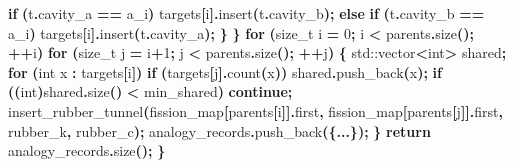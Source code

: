 \documentclass[
  11pt,
  a4paper,
]{article}
\newenvironment{Shaded}{\begin{snugshade}}{\end{snugshade}}
\newcommand{\BuiltInTok}[1]{#1}
\newcommand{\ControlFlowTok}[1]{\textcolor[rgb]{0.13,0.29,0.53}{\textbf{#1}}}
\newcommand{\DataTypeTok}[1]{\textcolor[rgb]{0.13,0.29,0.53}{#1}}
\newcommand{\DecValTok}[1]{\textcolor[rgb]{0.00,0.00,0.81}{#1}}
\newcommand{\NormalTok}[1]{#1}
\newcommand{\OperatorTok}[1]{\textcolor[rgb]{0.81,0.36,0.00}{\textbf{#1}}}
\begin{document}
\begin{Shaded}
\begin{Highlighting}[]
            \ControlFlowTok{if} \OperatorTok{(}\NormalTok{t}\OperatorTok{.}\NormalTok{cavity\_a }\OperatorTok{==}\NormalTok{ a\_i}\OperatorTok{)}\NormalTok{      targets}\OperatorTok{[}\NormalTok{i}\OperatorTok{].}\NormalTok{insert}\OperatorTok{(}\NormalTok{t}\OperatorTok{.}\NormalTok{cavity\_b}\OperatorTok{);}
            \ControlFlowTok{else} \ControlFlowTok{if} \OperatorTok{(}\NormalTok{t}\OperatorTok{.}\NormalTok{cavity\_b }\OperatorTok{==}\NormalTok{ a\_i}\OperatorTok{)}\NormalTok{ targets}\OperatorTok{[}\NormalTok{i}\OperatorTok{].}\NormalTok{insert}\OperatorTok{(}\NormalTok{t}\OperatorTok{.}\NormalTok{cavity\_a}\OperatorTok{);}
        \OperatorTok{\}}
    \OperatorTok{\}}
    \ControlFlowTok{for} \OperatorTok{(}\DataTypeTok{size\_t}\NormalTok{ i }\OperatorTok{=} \DecValTok{0}\OperatorTok{;}\NormalTok{ i }\OperatorTok{\textless{}}\NormalTok{ parents}\OperatorTok{.}\NormalTok{size}\OperatorTok{();} \OperatorTok{++}\NormalTok{i}\OperatorTok{)}
      \ControlFlowTok{for} \OperatorTok{(}\DataTypeTok{size\_t}\NormalTok{ j }\OperatorTok{=}\NormalTok{ i}\OperatorTok{+}\DecValTok{1}\OperatorTok{;}\NormalTok{ j }\OperatorTok{\textless{}}\NormalTok{ parents}\OperatorTok{.}\NormalTok{size}\OperatorTok{();} \OperatorTok{++}\NormalTok{j}\OperatorTok{)} \OperatorTok{\{}
        \BuiltInTok{std::}\NormalTok{vector}\OperatorTok{\textless{}}\DataTypeTok{int}\OperatorTok{\textgreater{}}\NormalTok{ shared}\OperatorTok{;}
        \ControlFlowTok{for} \OperatorTok{(}\DataTypeTok{int}\NormalTok{ x }\OperatorTok{:}\NormalTok{ targets}\OperatorTok{[}\NormalTok{i}\OperatorTok{])} \ControlFlowTok{if} \OperatorTok{(}\NormalTok{targets}\OperatorTok{[}\NormalTok{j}\OperatorTok{].}\NormalTok{count}\OperatorTok{(}\NormalTok{x}\OperatorTok{))}\NormalTok{ shared}\OperatorTok{.}\NormalTok{push\_back}\OperatorTok{(}\NormalTok{x}\OperatorTok{);}
        \ControlFlowTok{if} \OperatorTok{((}\DataTypeTok{int}\OperatorTok{)}\NormalTok{shared}\OperatorTok{.}\NormalTok{size}\OperatorTok{()} \OperatorTok{\textless{}}\NormalTok{ min\_shared}\OperatorTok{)} \ControlFlowTok{continue}\OperatorTok{;}
\NormalTok{        insert\_rubber\_tunnel}\OperatorTok{(}\NormalTok{fission\_map}\OperatorTok{[}\NormalTok{parents}\OperatorTok{[}\NormalTok{i}\OperatorTok{]].}\NormalTok{first}\OperatorTok{,}
\NormalTok{                             fission\_map}\OperatorTok{[}\NormalTok{parents}\OperatorTok{[}\NormalTok{j}\OperatorTok{]].}\NormalTok{first}\OperatorTok{,}
\NormalTok{                             rubber\_k}\OperatorTok{,}\NormalTok{ rubber\_c}\OperatorTok{);}
\NormalTok{        analogy\_records}\OperatorTok{.}\NormalTok{push\_back}\OperatorTok{(\{...\});}
    \OperatorTok{\}}
    \ControlFlowTok{return}\NormalTok{ analogy\_records}\OperatorTok{.}\NormalTok{size}\OperatorTok{();}
\OperatorTok{\}}
\end{Highlighting}
\end{Shaded}
\end{document}
